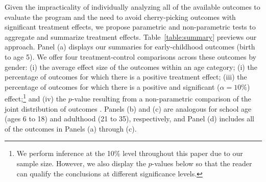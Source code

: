 Given the impracticality of individually analyzing all of the available outcomes to evaluate the program and the need to avoid cherry-picking outcomes with significant treatment effects, we propose parametric and non-parametric tests to aggregate and summarize treatment effects. Table~\ref{table:summary} previews our approach. Panel (a) displays our summaries for early-childhood outcomes (birth to age 5). We offer four treatment-control comparisons across these outcomes by gender: (i) the average effect size of the outcomes within an age category; (i) the percentage of outcomes for which there is a positive treatment effect; (iii) the percentage of outcomes for which there is a positive and significant ($\alpha=10\%$) effect;\footnote{We perform inference at the 10\% level throughout this paper due to our sample size. However, we also display the $p$-values below so that the reader can qualify the conclusions at different significance levels.} and (iv) the $p$-value resulting from a non-parametric comparison of the joint distribution of outcomes \citep{Rosenbaum_2005_Distribution_JRSS}. Panels (b) and (c) are analogous for school age (ages 6 to 18) and adulthood (21 to 35), respectively, and Panel (d) includes all of the outcomes in Panels (a) through (c).


